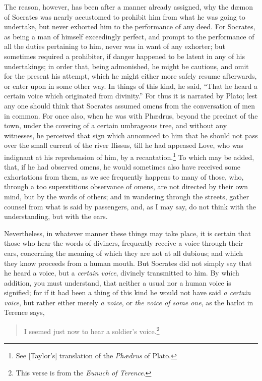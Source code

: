 \documentclass{article}
\begin{document}
The reason, however, has been after a manner already assigned, why the
d{\ae}mon of Socrates was nearly accustomed to prohibit him from what he was
going to undertake, but never exhorted him to the performance of any deed. For
Socrates, as being a man of himself exceedingly perfect, and prompt to the
performance of all the duties pertaining to him, never was in want of any
exhorter; but sometimes required a prohibiter, if danger happened to be latent
in any of his undertakings; in order that, being admonished, he might be
cautious, and omit for the present his attempt, which he might either more
safely resume afterwards, or enter upon in some other way. In things of this
kind, he said, ``That he heard a certain voice which originated from
divinity.'' For thus it is narrated by Plato; lest any one should think that
Socrates assumed omens from the conversation of men in common. For once also,
when he was with Ph{\ae}drus, beyond the precinct of the town, under the
covering of a certain umbrageous tree, and without any witnesses, he perceived
that sign which announced to him that he should not pass over the small current
of the river Ilissus, till he had appeased Love, who was indignant at his
reprehension of him, by a recantation.\footnote{See [Taylor's] translation of
the \textit{Ph{\ae}drus} of Plato.} To which may be added, that, if he had
observed omens, he would sometimes also have received some exhortations from
them, as we see frequently happens to many of those, who, through a too
superstitious observance of omens, are not directed by their own mind, but by
the words of others; and in wandering through the streets, gather counsel from
what is said by passengers, and, as I may say, do not think with the
understanding, but with the ears.

Nevertheless, in whatever manner these things may take place, it is certain
that those who hear the words of diviners, frequently receive a voice through
their ears, concerning the meaning of which they are not at all dubious; and
which they know proceeds from a human mouth. But Socrates did not simply say
that he heard a voice, but a \textit{certain voice}, divinely transmitted to
him.  By which addition, you must understand, that neither a usual nor a human
voice is signified; for if it had been a thing of this kind he would not have
said \textit{a certain voice}, but rather either merely \textit{a voice}, or
\textit{the voice of some one}, as the harlot in Terence says,

\begin{verse}
I seemed just now to hear a soldier's voice.\footnote{This verse is from the
\textit{Eunuch of Terence}.}
\end{verse}
\end{document}
